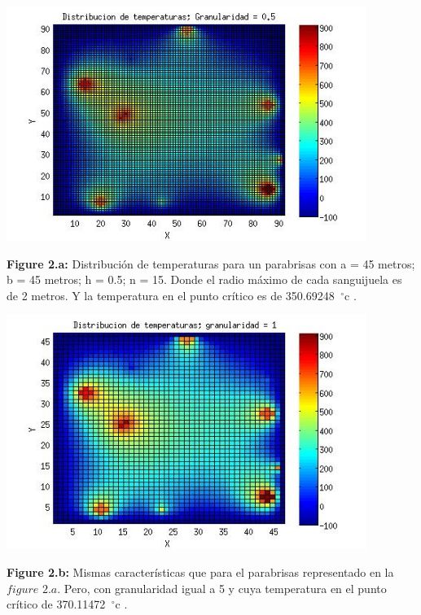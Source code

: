 \documentclass[a4paper]{article}
\begin{document}
\includegraphics[width=\textwidth,height=3.0in,keepaspectratio
]{45x45h0,5.jpg} \newline
\begin {flushleft}
\textbf{Figure 2.a:} Distribución de temperaturas para un parabrisas con a = 45 metros; b = 45 metros; h = 0.5; n = 15. Donde el radio máximo de cada sanguijuela es de 2 metros. Y la temperatura en el punto crítico es de  350.69248\hspace{-1.5mm}$\phantom{a}^{\circ}$c .
\end{flushleft}

\includegraphics[width=\textwidth,height=3.0in,keepaspectratio
]{45x45h1.jpg} \newline
\begin {flushleft}
\textbf{Figure 2.b:} Mismas características que para el parabrisas representado en la $figure$ $2.a$. Pero, con granularidad igual a 5 y cuya temperatura en el punto crítico de 370.11472\hspace{-1.5mm}$\phantom{a}^{\circ}$c .
\end{flushleft}
\end{document}
